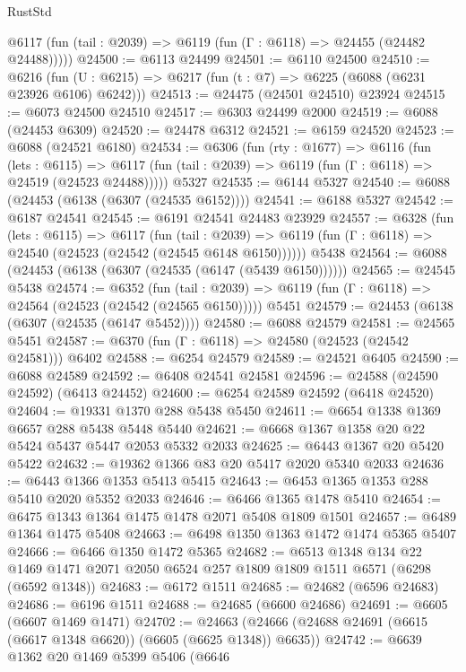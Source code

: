 \begin{lexlean}{RustStd}
\begin{coremodule}
      @6117 (fun (tail : @2039) => @6119 (fun (Γ : @6118) => @24455 (@24482 @24488)))))
@24500 := @6113 @24499
@24501 := @6110 @24500
@24510 := @6216
    (fun (U : @6215) => @6217 (fun (t : @7) => @6225 (@6088 (@6231 @23926 @6106) @6242)))
@24513 := @24475 (@24501 @24510) @23924
@24515 := @6073 @24500 @24510
@24517 := @6303 @24499 @2000
@24519 := @6088 (@24453 @6309)
@24520 := @24478 @6312
@24521 := @6159 @24520
@24523 := @6088 (@24521 @6180)
@24534 := @6306
    (fun (rty : @1677) =>
    @6116
      (fun (lets : @6115) =>
      @6117 (fun (tail : @2039) => @6119 (fun (Γ : @6118) => @24519 (@24523 @24488)))))
    @5327
@24535 := @6144 @5327
@24540 := @6088 (@24453 (@6138 (@6307 (@24535 @6152))))
@24541 := @6188 @5327
@24542 := @6187 @24541
@24545 := @6191 @24541 @24483 @23929
@24557 := @6328
    (fun (lets : @6115) =>
    @6117
      (fun (tail : @2039) =>
      @6119 (fun (Γ : @6118) => @24540 (@24523 (@24542 (@24545 @6148 @6150))))))
    @5438
@24564 := @6088 (@24453 (@6138 (@6307 (@24535 (@6147 (@5439 @6150))))))
@24565 := @24545 @5438
@24574 := @6352
    (fun (tail : @2039) => @6119 (fun (Γ : @6118) => @24564 (@24523 (@24542 (@24565 @6150)))))
    @5451
@24579 := @24453 (@6138 (@6307 (@24535 (@6147 @5452))))
@24580 := @6088 @24579
@24581 := @24565 @5451
@24587 := @6370 (fun (Γ : @6118) => @24580 (@24523 (@24542 @24581))) @6402
@24588 := @6254 @24579
@24589 := @24521 @6405
@24590 := @6088 @24589
@24592 := @6408 @24541 @24581
@24596 := @24588 (@24590 @24592) (@6413 @24452)
@24600 := @6254 @24589 @24592 (@6418 @24520)
@24604 := @19331 @1370 @288 @5438 @5450
@24611 := @6654 @1338 @1369 @6657 @288 @5438 @5448 @5440
@24621 := @6668 @1367 @1358 @20 @22 @5424 @5437 @5447 @2053 @5332 @2033
@24625 := @6443 @1367 @20 @5420 @5422
@24632 := @19362 @1366 @83 @20 @5417 @2020 @5340 @2033
@24636 := @6443 @1366 @1353 @5413 @5415
@24643 := @6453 @1365 @1353 @288 @5410 @2020 @5352 @2033
@24646 := @6466 @1365 @1478 @5410
@24654 := @6475 @1343 @1364 @1475 @1478 @2071 @5408 @1809 @1501
@24657 := @6489 @1364 @1475 @5408
@24663 := @6498 @1350 @1363 @1472 @1474 @5365 @5407
@24666 := @6466 @1350 @1472 @5365
@24682 := @6513
    @1348
    @134
    @22
    @1469
    @1471
    @2071
    @2050
    @6524
    @257
    @1809
    @1809
    @1511
    @6571
    (@6298 (@6592 @1348))
@24683 := @6172 @1511
@24685 := @24682 (@6596 @24683)
@24686 := @6196 @1511
@24688 := @24685 (@6600 @24686)
@24691 := @6605 (@6607 @1469 @1471)
@24702 := @24663 (@24666 (@24688 @24691 (@6615 (@6617 @1348 @6620)) (@6605 (@6625 @1348)) @6635))
@24742 := @6639
    @1362
    @20
    @1469
    @5399
    @5406
    (@6646

\end{coremodule}
\end{lexlean}
